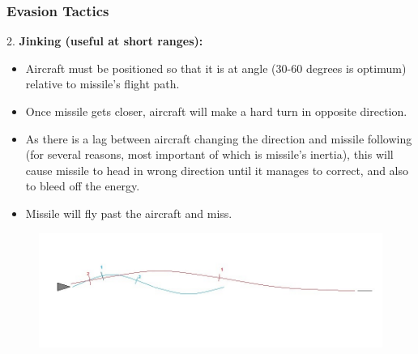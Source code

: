 \documentclass{beamer}
\begin{document}
\begin{frame}
\frametitle{Evasion Tactics}

2. \textbf{ Jinking (useful at short ranges):}
	\begin{itemize}
		\item Aircraft must be positioned so that it is at angle (30-60 degrees is optimum) relative to missile’s flight path.
		\item Once missile gets closer, aircraft will make a hard turn in opposite direction.
		\item As there is a lag between aircraft changing the direction and missile following (for several reasons, most important of which is missile’s inertia), this will cause missile to head in wrong direction until it manages to correct, and also to bleed off the energy.
		\item Missile will fly past the aircraft and miss.
	\end{itemize}
	
	
	\begin{figure}[H]
		\centering
		\includegraphics[scale = 0.45]{fig/evasiontech2.jpg}
	\end{figure}
	
\end{frame}
\end{document}
